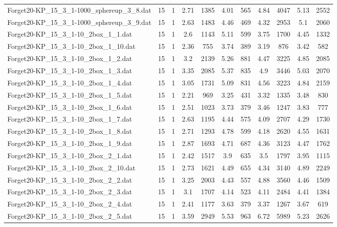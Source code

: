 \begin{table}[!ht]
\begin{tabular}{lcccccccccc}
Forget20-KP\_15\_3\_1-1000\_sphereup\_3\_8.dat & 15 & 1 & 2.71 & 1385 & 4.01 & 565 & 4.84 & 4047 & 5.13 & 2552 \\
Forget20-KP\_15\_3\_1-1000\_sphereup\_3\_9.dat & 15 & 1 & 2.63 & 1483 & 4.46 & 469 & 4.32 & 2953 & 5.1 & 2060 \\
Forget20-KP\_15\_3\_1-10\_2box\_1\_1.dat & 15 & 1 & 2.6 & 1143 & 5.11 & 599 & 3.75 & 1700 & 4.45 & 1332 \\
Forget20-KP\_15\_3\_1-10\_2box\_1\_10.dat & 15 & 1 & 2.36 & 755 & 3.74 & 389 & 3.19 & 876 & 3.42 & 582 \\
Forget20-KP\_15\_3\_1-10\_2box\_1\_2.dat & 15 & 1 & 3.2 & 2139 & 5.26 & 881 & 4.47 & 3225 & 4.85 & 2085 \\
Forget20-KP\_15\_3\_1-10\_2box\_1\_3.dat & 15 & 1 & 3.35 & 2085 & 5.37 & 835 & 4.9 & 3446 & 5.03 & 2070 \\
Forget20-KP\_15\_3\_1-10\_2box\_1\_4.dat & 15 & 1 & 3.05 & 1731 & 5.09 & 831 & 4.56 & 3223 & 4.84 & 2159 \\
Forget20-KP\_15\_3\_1-10\_2box\_1\_5.dat & 15 & 1 & 2.21 & 969 & 3.25 & 431 & 3.32 & 1335 & 3.48 & 830 \\
Forget20-KP\_15\_3\_1-10\_2box\_1\_6.dat & 15 & 1 & 2.51 & 1023 & 3.73 & 379 & 3.46 & 1247 & 3.83 & 777 \\
Forget20-KP\_15\_3\_1-10\_2box\_1\_7.dat & 15 & 1 & 2.63 & 1195 & 4.44 & 575 & 4.09 & 2707 & 4.29 & 1730 \\
Forget20-KP\_15\_3\_1-10\_2box\_1\_8.dat & 15 & 1 & 2.71 & 1293 & 4.78 & 599 & 4.18 & 2620 & 4.55 & 1631 \\
Forget20-KP\_15\_3\_1-10\_2box\_1\_9.dat & 15 & 1 & 2.87 & 1693 & 4.71 & 687 & 4.36 & 3123 & 4.47 & 1762 \\
Forget20-KP\_15\_3\_1-10\_2box\_2\_1.dat & 15 & 1 & 2.42 & 1517 & 3.9 & 635 & 3.5 & 1797 & 3.95 & 1115 \\
Forget20-KP\_15\_3\_1-10\_2box\_2\_10.dat & 15 & 1 & 2.73 & 1621 & 4.49 & 655 & 4.34 & 3140 & 4.89 & 2249 \\
Forget20-KP\_15\_3\_1-10\_2box\_2\_2.dat & 15 & 1 & 3.25 & 2003 & 4.43 & 557 & 4.88 & 3560 & 4.46 & 1509 \\
Forget20-KP\_15\_3\_1-10\_2box\_2\_3.dat & 15 & 1 & 3.1 & 1707 & 4.14 & 523 & 4.11 & 2484 & 4.41 & 1384 \\
Forget20-KP\_15\_3\_1-10\_2box\_2\_4.dat & 15 & 1 & 2.41 & 1177 & 3.63 & 379 & 3.37 & 1267 & 3.67 & 619 \\
Forget20-KP\_15\_3\_1-10\_2box\_2\_5.dat & 15 & 1 & 3.59 & 2949 & 5.53 & 963 & 6.72 & 5989 & 5.23 & 2626 \\

\end{tabular}
\end{table}
